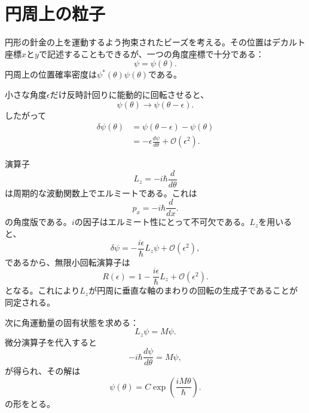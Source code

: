 \section{円周上の粒子}

円形の針金の上を運動するよう拘束されたビーズを考える。その位置はデカルト座標\(x\)と\(y\)で記述することもできるが、一つの角度座標で十分である：
\begin{equation}
\psi=\psi(\theta).
\end{equation}
円周上の位置確率密度は\(\psi^*(\theta)\psi(\theta)\)である。

小さな角度\(\epsilon\)だけ反時計回りに能動的に回転させると、
\begin{equation}
\psi(\theta)\longrightarrow\psi(\theta-\epsilon).
\end{equation}
したがって
\begin{align}
\delta\psi(\theta)
&=\psi(\theta-\epsilon)-\psi(\theta)\\
&=-\epsilon\frac{d\psi}{d\theta}
+\mathcal O(\epsilon^2).
\end{align}

演算子
\begin{equation}
L_z=-i\hbar\frac{d}{d\theta}
\end{equation}
は周期的な波動関数上でエルミートである。これは
\begin{equation}
p_x=-i\hbar\frac{d}{dx}.
\end{equation}
の角度版である。\(i\)の因子はエルミート性にとって不可欠である。\(L_z\)を用いると、
\begin{equation}
\delta\psi
=-\frac{i\epsilon}{\hbar}L_z\psi
+\mathcal O(\epsilon^2),
\end{equation}
であるから、無限小回転演算子は
\begin{equation}
R(\epsilon)
=1-\frac{i\epsilon}{\hbar}L_z
+\mathcal O(\epsilon^2).
\end{equation}
となる。これにより\(L_z\)が円周に垂直な軸のまわりの回転の生成子であることが同定される。

\begin{classroomqa}
\end{classroomqa}

次に角運動量の固有状態を求める：
\begin{equation}
L_z\psi=M\psi.
\end{equation}
微分演算子を代入すると
\begin{equation}
-i\hbar\frac{d\psi}{d\theta}=M\psi,
\end{equation}
が得られ、その解は
\begin{equation}
\psi(\theta)=C\exp\left(\frac{iM\theta}{\hbar}\right).
\end{equation}
の形をとる。

